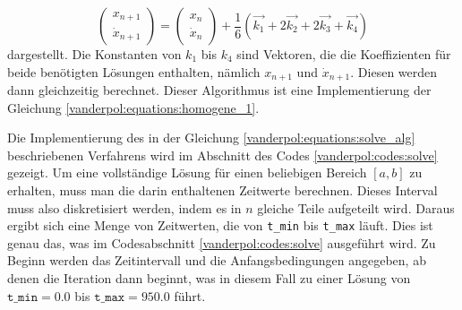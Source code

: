\begin{equation}
\begin{pmatrix}x_{n+1} \\ \dot{x}_{n+1} \end{pmatrix} = \begin{pmatrix}x_{n} \\ \dot{x}_{n} \end{pmatrix} + \frac{1}{6}(\vec{k_1} + 2\vec{k_2} + 2\vec{k_3} + \vec{k_4})
\label{vanderpol:equations:solve_alg}
\end{equation}
dargestellt. Die Konstanten von $k_1$ bis $k_4$ sind Vektoren, die die Koeffizienten für beide benötigten Lösungen enthalten, nämlich $x_{n+1}$ und $\dot{x}_{n+1}$.
Diesen werden dann gleichzeitig berechnet. Dieser Algorithmus ist eine Implementierung der Gleichung \eqref{vanderpol:equations:homogene_1}.

Die Implementierung des in der Gleichung \eqref{vanderpol:equations:solve_alg} beschriebenen Verfahrens wird im Abschnitt des Codes \ref{vanderpol:codes:solve} gezeigt.
Um eine vollständige Lösung für einen beliebigen Bereich $[a, b]$ zu erhalten, muss man die darin enthaltenen Zeitwerte berechnen. Dieses Interval muss also diskretisiert werden, indem es in $n$ gleiche Teile aufgeteilt wird. Daraus ergibt sich eine Menge von Zeitwerten, die von \texttt{t\_min} bis \texttt{t\_max} läuft.
Dies ist genau das, was im Codesabschnitt \ref{vanderpol:codes:solve} ausgeführt wird. Zu Beginn werden das Zeitintervall und die Anfangsbedingungen angegeben, ab denen die Iteration dann beginnt, was in diesem Fall zu einer Lösung von $\texttt{t\_min}=0.0$ bis $\texttt{t\_max}=950.0$ führt.